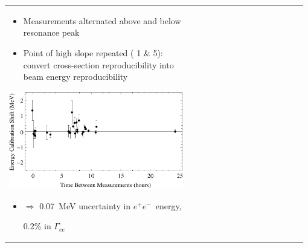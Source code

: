 \documentclass[landscape]{article}
\newcommand{\gee}{{\boldmath $\Gamma_{ee}$}}
\newcommand{\ee}{$e^+e^-$}
\begin{document}
\begin{slide:energy}

\begin{tabular}{p{0.6\linewidth} p{0.38\linewidth}}
  \begin{minipage}{\linewidth}
    \begin{minipage}{0.9\linewidth}
      \begin{itemize}\setlength{\itemsep}{0.75 cm}

        \item Measurements alternated above and below resonance peak

        \item Point of high slope repeated ({\color{red} 1 \& 5}):
        convert cross-section reproducibility into beam energy reproducibility

        \end{itemize}

      \vspace{0.5 cm}
      \includegraphics[width=\linewidth]{plots/miscalhours}

      \begin{itemize}\setlength{\itemsep}{0.75 cm}

        \item $\Rightarrow$ 0.07~MeV uncertainty in \ee\ energy,
	  \begin{center}
	    0.2\% in \gee
	  \end{center}

      \end{itemize}

    \end{minipage}


\end{minipage}
\end{tabular}
\end{slide:energy}
\end{document}
